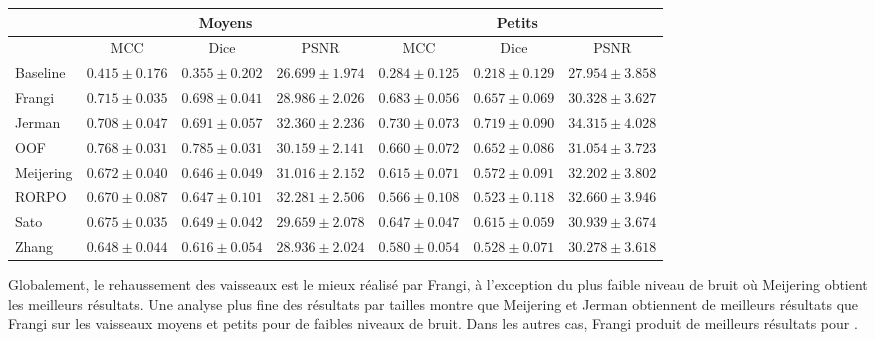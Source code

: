 \begin{table}[H]
\begin{centering}
{\begin{tabular}{lccc|ccc}
            \hline
            & \multicolumn{3}{c}{Moyens}                         & \multicolumn{3}{c}{Petits}                           \\
            \hline
            & MCC  & Dice & PSNR & MCC & Dice & PSNR  \\
            Baseline	    & $ 0.415 \pm 0.176 $ & $ 0.355 \pm 0.202 $ & $	26.699 \pm 1.974 $ & $	0.284 \pm 0.125 $ & $ 0.218 \pm 0.129 $ & $ 27.954 \pm 3.858 $ \\
            Frangi	    & $ 0.715 \pm 0.035 $ & $ 0.698 \pm 0.041 $ & $	28.986 \pm 2.026 $ & $	0.683 \pm 0.056 $ & $ 0.657 \pm 0.069 $ & $ 30.328 \pm 3.627 $ \\
            Jerman	    & $ 0.708 \pm 0.047 $ & $ 0.691 \pm 0.057 $ & $	32.360 \pm 2.236 $ & $	0.730 \pm 0.073 $ & $ 0.719 \pm 0.090 $ & $ 34.315 \pm 4.028 $ \\
            OOF	        & $ 0.768 \pm 0.031 $ & $ 0.785 \pm 0.031 $ & $	30.159 \pm 2.141 $ & $	0.660 \pm 0.072 $ & $ 0.652 \pm 0.086 $ & $ 31.054 \pm 3.723 $ \\
            Meijering	    & $ 0.672 \pm 0.040 $ & $ 0.646 \pm 0.049 $ & $	31.016 \pm 2.152 $ & $	0.615 \pm 0.071 $ & $ 0.572 \pm 0.091 $ & $ 32.202 \pm 3.802 $ \\
            RORPO	        & $ 0.670 \pm 0.087 $ & $ 0.647 \pm 0.101 $ & $	32.281 \pm 2.506 $ & $	0.566 \pm 0.108 $ & $ 0.523 \pm 0.118 $ & $ 32.660 \pm 3.946 $ \\
            Sato	        & $ 0.675 \pm 0.035 $ & $ 0.649 \pm 0.042 $ & $	29.659 \pm 2.078 $ & $	0.647 \pm 0.047 $ & $ 0.615 \pm 0.059 $ & $ 30.939 \pm 3.674 $ \\
            Zhang	        & $ 0.648 \pm 0.044 $ & $ 0.616 \pm 0.054 $ & $	28.936 \pm 2.024 $ & $	0.580 \pm 0.054 $ & $ 0.528 \pm 0.071 $ & $ 30.278 \pm 3.618 $ \\
  \hline
  \end{tabular}
  }
  \end{centering} 
\end{table}

Globalement, le rehaussement des vaisseaux est le mieux réalisé par Frangi, à l'exception du plus faible niveau de bruit où Meijering obtient les meilleurs résultats. Une analyse plus fine des résultats par tailles montre que Meijering et Jerman obtiennent de meilleurs résultats que Frangi sur les vaisseaux moyens et petits pour de faibles niveaux de bruit.  Dans les autres cas, Frangi produit de meilleurs résultats pour \maskvessel.

